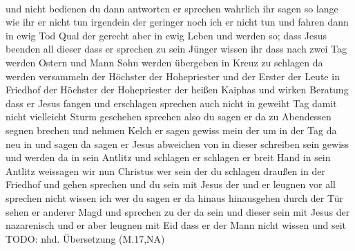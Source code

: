 \begin{exe}
            \object{:}                                       \\
{und} {nicht} {bedienen} {du} {} {dann} {antworten} {er} {sprechen} {wahrlich} {ihr} {sagen} {so lange wie} {ihr} {er} {nicht} {tun} {irgendein} {der} {geringer} {noch} {ich} {er} {nicht} {tun} {und} {fahren} {dann} {in} {ewig} {Tod} {Qual} {der} {gerecht} {aber} {in} {ewig} {Leben} {} {und} {werden} {so; dass} {Jesus} {beenden} {all} {dieser} {dass} {er} {sprechen} {zu} {sein} {Jünger} {wissen} {ihr} {dass} {nach} {zwei} {Tag} {werden} {Ostern} {und} {Mann} {Sohn} {werden} {übergeben} {in} {Kreuz} {zu} {schlagen} {da} {werden} {versammeln} {der} {Höchster} {der} {Hohepriester} {und} {der} {Erster} {der} {Leute} {in} {Friedhof} {der} {Höchster} {der} {Hohepriester} {der} {heißen} {Kaiphas} {} {und} {wirken} {Beratung} {dass} {er} {Jesus} {} {fangen} {und} {erschlagen} {sprechen} {auch} {nicht} {in} {geweiht} {Tag} {damit nicht} {vielleicht} {Sturm} {geschehen} {sprechen} {also} {} {du} {sagen} {} {er} {da} {zu} {Abendessen} {} {segnen} {brechen} {} {und} {nehmen} {Kelch} {} {er} {sagen} {} {gewiss} {mein} {} {der} {um} {} {} {} {} {} {} {in} {der} {Tag} {da} {} {neu} {in} {} {und} {sagen} {} {da} {sagen} {er} {Jesus} {} {abweichen von} {in} {dieser} {} {schreiben} {sein} {gewiss} {} {und} {werden} {} {} {da} {in} {sein} {Antlitz} {und} {schlagen} {er} {} {schlagen} {er} {breit} {Hand} {in} {sein} {Antlitz} {} {weissagen} {wir} {nun} {Christus} {wer} {sein} {der} {du} {schlagen} {} {} {draußen} {in} {der} {Friedhof} {und} {gehen} {} {sprechen} {und} {du} {sein} {mit} {Jesus} {der} {} {und} {er} {leugnen} {vor} {all} {sprechen} {nicht} {wissen} {ich} {wer} {du} {sagen} {} {er} {da} {hinaus} {hinausgehen} {durch} {der} {Tür} {sehen} {er} {anderer} {Magd} {und} {sprechen} {zu} {der} {da} {sein} {und} {dieser} {sein} {mit} {Jesus} {der} {nazarenisch} {und} {er} {aber} {leugnen} {mit} {Eid} {dass} {er} {der} {Mann} {nicht} {wissen} {und} {seit}\\
\glt TODO: nhd. Übersetzung (M.17,NA)
\end{exe}
